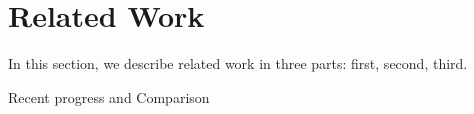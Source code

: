 \section{Related Work}
\label{relatedwork}

In this section, we describe related work in three parts: first, second, third.

Recent progress and Comparison
 
